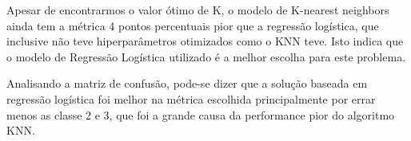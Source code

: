 \documentclass[11pt]{article}
\begin{document}
    Apesar de encontrarmos o valor ótimo de K, o modelo de K-nearest
neighbors ainda tem a métrica 4 pontos percentuais pior que a regressão
logística, que inclusive não teve hiperparâmetros otimizados como o KNN
teve. Isto indica que o modelo de Regressão Logística utilizado é a
melhor escolha para este problema.

Analisando a matriz de confusão, pode-se dizer que a solução baseada em
regressão logística foi melhor na métrica escolhida principalmente por
errar menos as classe 2 e 3, que foi a grande causa da performance pior
do algoritmo KNN.


    
    
    
\end{document}

